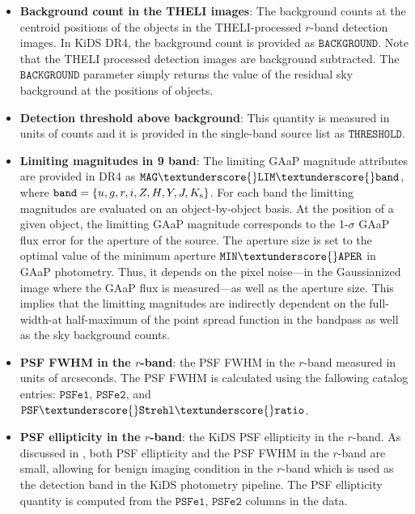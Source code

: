 \documentclass[fleqn,usenatbib,useAMS]{mnras}
\begin{document}
\begin{itemize}

  \item \textbf{Background count in the THELI images}: The background counts at the centroid positions of the objects in the THELI-processed $r$-band detection images. In KiDS DR4, the background count is provided as $\mathtt{BACKGROUND}$. Note that the THELI processed detection images are background subtracted. The $\mathtt{BACKGROUND}$ parameter simply returns the value of the residual sky background at the positions of objects. %

  \item \textbf{Detection threshold above background}: This quantity is measured in units of counts and it is provided in the single-band source list as $\mathtt{THRESHOLD}$. 
  
  \item \textbf{Limiting magnitudes in 9 band}: The limiting GAaP magnitude attributes are provided in DR4 as $\mathtt{MAG}\textunderscore{}\mathtt{LIM}\textunderscore{} \mathtt{band}$, where $\mathtt{band} = \{u,g,r,i,Z,H,Y,J,K_{\rm s}\}$. 
  For each band the limitting magnitudes are evaluated on an object-by-object basis. At the position of a given object, the limitting GAaP magnitude corresponds to the 1-$\sigma$ GAaP flux error for the aperture of the source. The aperture size is set to the optimal value of the minimum aperture $\mathtt{MIN}\textunderscore{}\mathtt{APER}$ in GAaP photometry. Thus, it depends on the pixel noise---in the Gaussianized image where the GAaP flux is measured---as well as the aperture size. This implies that the limitting magnitudes are indirectly dependent on the full-width-at half-maximum of the point spread function in the bandpass as well as the sky background counts.   
  
  \item \textbf{PSF FWHM in the $r$-band}: the PSF FWHM in the $r$-band measured in units of arcseconds. The PSF FWHM is calculated using the fallowing catalog entries: $\mathtt{PSFe1}$, $\mathtt{PSFe2}$, and $\mathtt{PSF \textunderscore{} Strehl \textunderscore{} ratio}$.
    
  \item \textbf{PSF ellipticity in the $r$-band}: the KiDS PSF ellipticity in the $r$-band. As discussed in \citet{kuijken2019}, both PSF ellipticity and the PSF FWHM in the $r$-band are small, allowing for benign imaging condition in the $r$-band which is used as the detection band in the KiDS photometry pipeline. 
  The PSF ellipticity quantity is computed from the $\mathtt{PSFe1}$, $\mathtt{PSFe2}$ columns in the data.
  

\end{itemize}
\end{document}
